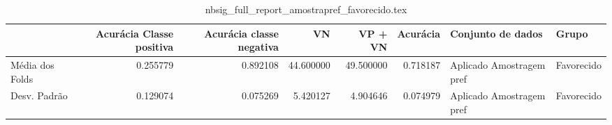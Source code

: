 \begin{table}
\centering
\caption{nbsig_full_report_amostrapref_favorecido.tex}
\label{nbsig_full_report_amostrapref_favorecido.tex}
\begin{tabular}{lrrrrrll}
\toprule
{} &  Acurácia Classe positiva &  Acurácia classe negativa &        VN  &   VP + VN  &  Acurácia &         Conjunto de dados &       Grupo \\
\midrule
Média dos Folds &                  0.255779 &                  0.892108 &  44.600000 &  49.500000 &  0.718187 &  Aplicado Amostragem pref &  Favorecido \\
Desv. Padrão    &                  0.129074 &                  0.075269 &   5.420127 &   4.904646 &  0.074979 &  Aplicado Amostragem pref &  Favorecido \\
\bottomrule
\end{tabular}
\end{table}
